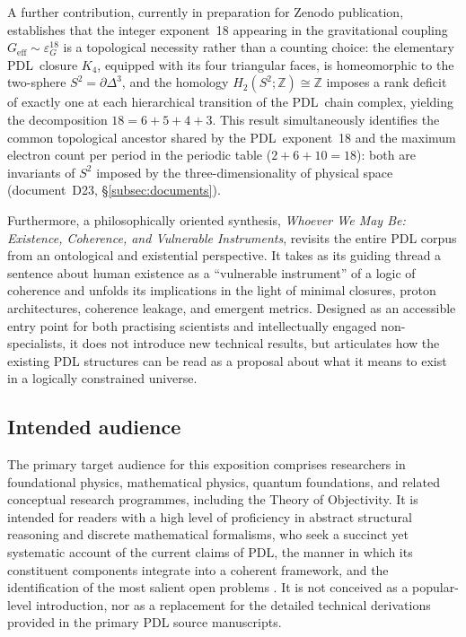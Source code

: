 \documentclass[11pt,a4paper]{article}
\newcommand{\PDL}{\textnormal{PDL}}
\begin{document}
A further contribution, currently in preparation for Zenodo publication, establishes that the integer exponent~18 appearing in the gravitational coupling $G_{\mathrm{eff}} \sim \varepsilon_G^{18}$ is a topological necessity rather than a counting choice: the elementary \PDL\ closure $K_4$, equipped with its four triangular faces, is homeomorphic to the two-sphere $S^2 = \partial\Delta^3$, and the homology $H_2(S^2;\mathbb{Z}) \cong \mathbb{Z}$ imposes a rank deficit of exactly one at each hierarchical transition of the \PDL\ chain complex, yielding the decomposition $18 = 6+5+4+3$. This result simultaneously identifies the common topological ancestor shared by the \PDL\ exponent~18 and the maximum electron count per period in the periodic table ($2+6+10 = 18$): both are invariants of $S^2$ imposed by the three-dimensionality of physical space (document~D23, \S\ref{subsec:documents}).

Furthermore, a philosophically oriented synthesis, \textit{Whoever We May Be: Existence, Coherence, and Vulnerable Instruments}, revisits the entire PDL corpus from an ontological and existential perspective.\citep{WhoeverWeMayBe2026} It takes as its guiding thread a sentence about human existence as a ``vulnerable instrument'' of a logic of coherence and unfolds its implications in the light of minimal closures, proton architectures, coherence leakage, and emergent metrics.\citep{WhoeverWeMayBe2026} Designed as an accessible entry point for both practising scientists and intellectually engaged non-specialists, it does not introduce new technical results, but articulates how the existing PDL structures can be read as a proposal about what it means to exist in a logically constrained universe.\citep{WhoeverWeMayBe2026}

\subsection{Intended audience}
\label{subsec:intended_audience}

The primary target audience for this exposition comprises researchers in foundational physics, mathematical physics, quantum foundations, and related conceptual research programmes, including the Theory of Objectivity. It is intended for readers with a high level of proficiency in abstract structural reasoning and discrete mathematical formalisms, who seek a succinct yet systematic account of the current claims of PDL, the manner in which its constituent components integrate into a coherent framework, and the identification of the most salient open problems \citep{PDL_intro,PDL_TO_dialogue,PDL_position}. It is not conceived as a popular-level introduction, nor as a replacement for the detailed technical derivations provided in the primary PDL source manuscripts.
\end{document}
